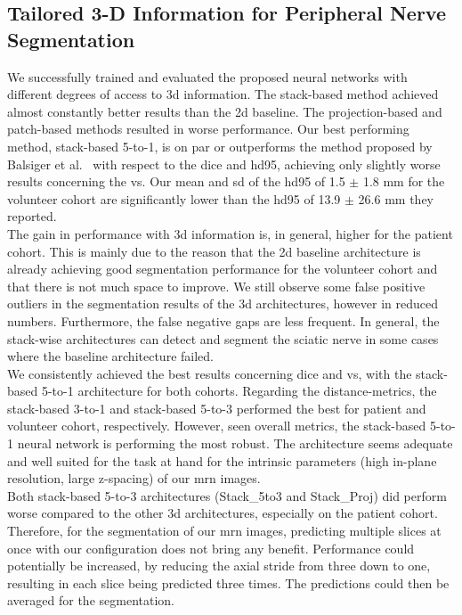 \subsection{Tailored 3-D Information for Peripheral Nerve Segmentation}
We successfully trained and evaluated the proposed neural networks with different degrees of access to \gls{3d} information. The stack-based method achieved almost constantly better results than the \gls{2d} baseline. The projection-based and patch-based methods resulted in worse performance. Our best performing method, stack-based 5-to-1, is on par or outperforms the method proposed by Balsiger et al.~\cite{Balsiger2018SegmentationApproach} with respect to the \acrlong{dice} and \acrlong{hd95}, achieving only slightly worse results concerning the \acrlong{vs}. Our mean and \gls{sd} of the \gls{hd95} of 1.5 $\pm$ 1.8 mm for the volunteer cohort are significantly lower than the \gls{hd95} of 13.9 $\pm$ 26.6 mm they reported.\\
The gain in performance with \gls{3d} information is, in general, higher for the patient cohort. This is mainly due to the reason that the \gls{2d} baseline architecture is already achieving good segmentation performance for the volunteer cohort and that there is not much space to improve. We still observe some false positive outliers in the segmentation results of the \gls{3d} architectures, however in reduced numbers. Furthermore, the false negative gaps are less frequent. In general, the stack-wise architectures can detect and segment the sciatic nerve in some cases where the baseline architecture failed.\\
We consistently achieved the best results concerning \acrlong{dice} and \acrlong{vs}, with the stack-based 5-to-1 architecture for both cohorts. Regarding the distance-metrics, the stack-based 3-to-1 and stack-based 5-to-3 performed the best for patient and volunteer cohort, respectively. However, seen overall metrics, the stack-based 5-to-1 neural network is performing the most robust. The architecture seems adequate and well suited for the task at hand for the intrinsic parameters (high in-plane resolution, large z-spacing) of our \gls{mrn} images.\\
Both stack-based 5-to-3 architectures (Stack\_5to3 and Stack\_Proj) did perform worse compared to the other \gls{3d} architectures, especially on the patient cohort. Therefore, for the segmentation of our \gls{mrn} images, predicting multiple slices at once with our configuration does not bring any benefit. Performance could potentially be increased, by reducing the axial stride from three down to one, resulting in each slice being predicted three times. The predictions could then be averaged for the segmentation.
